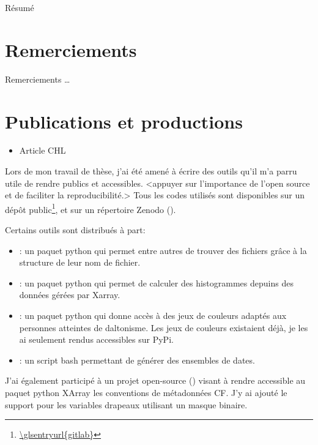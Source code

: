
Résumé

\clearpage
\section*{Remerciements}
\label{sec:thanks}
Remerciements \dots

\clearpage
\section{Publications et productions}
\label{sec:productions}

\begin{itemize}
        \item Article CHL
\end{itemize}
\medskip

Lors de mon travail de thèse, j'ai été amené à écrire des outils qu'il m'a parru utile de rendre publics et accessibles.
<appuyer sur l'importance de l'open source et de faciliter la reproducibilité.>
Tous les codes utilisés sont disponibles sur un dépôt public\footnote{
  \url{\glsentryurl{gitlab}}
}, et sur un répertoire Zenodo ().
\medskip

Certains outils sont distribués à part:
\begin{itemize}
  \item {}:
        un paquet python qui permet entre autres de trouver des fichiers grâce à la structure de leur nom de fichier.
  \item {}:
        un paquet python qui permet de calculer des histogrammes depuins des données gérées par Xarray.
  \item {}:
        un paquet python qui donne accès à des jeux de couleurs adaptés aux personnes atteintes de daltonisme. Les jeux de couleurs existaient déjà, je les ai seulement rendus accessibles sur PyPi.
  \item {}:
        un script bash permettant de générer des ensembles de dates.
\end{itemize}
\medskip

J'ai également participé à un projet open-source () visant à rendre accessible au paquet python XArray les conventions de métadonnées CF.\@
J'y ai ajouté le support pour les variables drapeaux utilisant un masque binaire.
